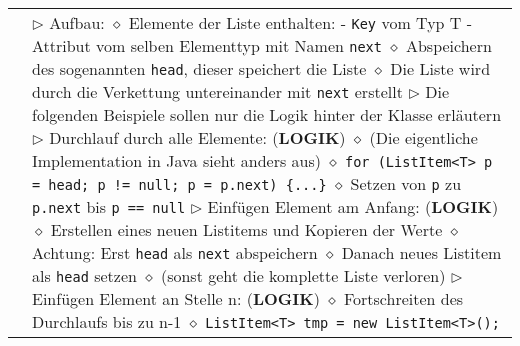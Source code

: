 \begin{longtable}{ | p{} p{} | }
	\makecell[l]{\texttt{LinkedList}} & \makecell[l]{
	$\rhd$ Aufbau: \\
	\hspace{0.4cm} $\diamond$ Elemente der Liste enthalten: \\
	\hspace{0.6cm} - \texttt{Key} vom Typ T \\
	\hspace{0.6cm} - Attribut vom selben Elementtyp mit Namen \texttt{next} \\
	\hspace{0.4cm} $\diamond$ Abspeichern des sogenannten \texttt{head}, dieser speichert die Liste \\
	\hspace{0.4cm} $\diamond$ Die Liste wird durch die Verkettung untereinander mit \texttt{next} erstellt \\
	$\rhd$ Die folgenden Beispiele sollen nur die Logik hinter der Klasse erläutern
	$\rhd$ Durchlauf durch alle Elemente: (\textbf{LOGIK})\\
	\hspace{0.4cm} $\diamond$ (Die eigentliche Implementation in Java sieht anders aus) \\
	\hspace{0.4cm} $\diamond$ \texttt{for (ListItem<T> p = head; p != null; p = p.next) \{...\}} \\
	\hspace{0.4cm} $\diamond$ Setzen von \texttt{p} zu \texttt{p.next} bis \texttt{p == null} \\
	$\rhd$ Einfügen Element am Anfang: (\textbf{LOGIK}) \\
	\hspace{0.4cm} $\diamond$ Erstellen eines neuen Listitems und Kopieren der Werte \\
	\hspace{0.4cm} $\diamond$ Achtung: Erst \texttt{head} als \texttt{next} abspeichern \\
	\hspace{0.4cm} $\diamond$ Danach neues Listitem als \texttt{head} setzen \\
	\hspace{0.4cm} $\diamond$ (sonst geht die komplette Liste verloren) \\
	$\rhd$ Einfügen Element an Stelle n: (\textbf{LOGIK}) \\
	\hspace{0.4cm} $\diamond$ Fortschreiten des Durchlaufs bis zu n-1 \\
	\hspace{0.4cm} $\diamond$ \texttt{ListItem<T> tmp = new ListItem<T>();} \\
}
\end{longtable}
